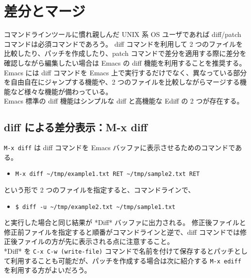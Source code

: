 \section{差分とマージ}
コマンドラインツールに慣れ親しんだ UNIX 系 OS ユーザであれば diff/patch コマンドは必須コマンドであろう。
diff コマンドを利用して 2 つのファイルを比較したり、パッチを作成したり、patch コマンドで差分を適用する際に差分を確認しながら編集したい場合は Emacs の diff 機能を利用することを推奨する。\\

Emacs には diff コマンドを Emacs 上で実行するだけでなく、異なっている部分を自由自在にジャンプする機能や、2 つのファイルを比較しながらマージする機能など様々な機能が備わっている。\\

Emacs 標準の diff 機能はシンプルな diff と高機能な Ediff の 2 つが存在する。
\subsection{diff による差分表示：M-x diff}
\texttt{M-x diff} は diff コマンドを Emacs バッファに表示させるためのコマンドである。
\begin{itemize}\setlength{\leftskip}{-1.00zw}%
\item[] \texttt{M-x diff \textasciitilde{}/tmp/example1.txt RET \textasciitilde{}/tmp/sample2.txt RET}
\end{itemize}
という形で 2 つのファイルを指定すると、コマンドラインで、
\begin{itemize}\setlength{\leftskip}{-1.00zw}%
\item[] \texttt{\$ diff -u \textasciitilde{}/tmp/example2.txt \textasciitilde{}/tmp/sample1.txt}
\end{itemize}
と実行した場合と同じ結果が *Diff* バッファに出力される。
修正後ファイルと修正前ファイルを指定すると順番がコマンドラインと逆で、diff コマンドでは修正後ファイルの方が先に表示される点に注意すること。\\

*Diff* を \texttt{C-x C-w (write-file)} コマンドで名前を付けて保存するとパッチとして利用することも可能だが、パッチを作成する場合は次に紹介する \texttt{M-x ediff} を利用する方がよいだろう。
